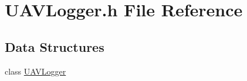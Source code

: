 \hypertarget{a00041}{\section{U\-A\-V\-Logger.\-h File Reference}
\label{a00041}
}
\subsection*{Data Structures}
\begin{DoxyCompactItemize}
\item 
class \hyperlink{a00014}{U\-A\-V\-Logger}
\end{DoxyCompactItemize}
